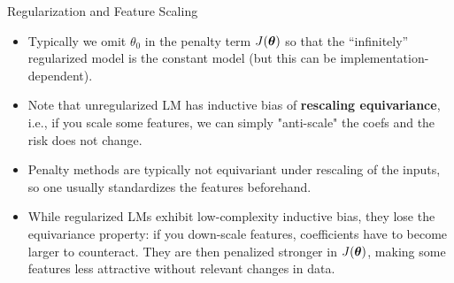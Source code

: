 \documentclass[11pt,compress,t,notes=noshow, xcolor=table]{beamer}
\begin{document}
\begin{vbframe}{Regularization and Feature Scaling}

  \begin{itemize}
    \item Typically we omit $\theta_0$ in the penalty term $J(\bm{\theta})$ so that the ``infinitely'' regularized model is the constant model (but this can be implementation-dependent).
    \item Note that unregularized LM has inductive bias of \textbf{rescaling equivariance}, i.e., if you scale some features, we can simply "anti-scale" the coefs and the risk does not change.
    \item Penalty methods are typically not equivariant under rescaling of the inputs, so one usually standardizes the features beforehand.  
    \item While regularized LMs exhibit low-complexity inductive bias, they lose the equivariance property: if you down-scale features, coefficients have to become larger to counteract. They are then penalized stronger in $J(\bm{\theta})$, making some features less attractive without relevant changes in data.
      
  \end{itemize}

\framebreak



\end{vbframe}
\end{document}
